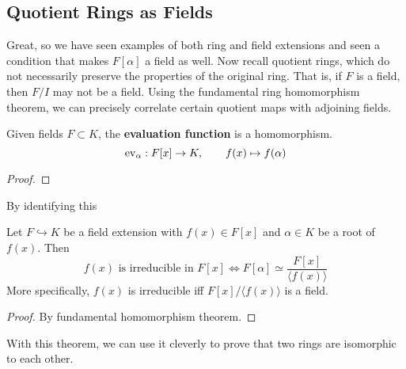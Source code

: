 \subsection{Quotient Rings as Fields} 

  Great, so we have seen examples of both ring and field extensions and seen a condition that makes $F[\alpha]$ a field as well. Now recall quotient rings, which do not necessarily preserve the properties of the original ring. That is, if $F$ is a field, then $F/I$ may not be a field. Using the fundamental ring homomorphism theorem, we can precisely correlate certain quotient maps with adjoining fields. 

  \begin{theorem}
    Given fields $F \subset K$, the \textbf{evaluation function} is a homomorphism. 
    \begin{equation}
      \operatorname{ev}_\alpha: F[x] \rightarrow K, \qquad f(x) \mapsto f(\alpha)
    \end{equation}
  \end{theorem}
  \begin{proof}
    
  \end{proof} 

  By identifying this 

  \begin{theorem}
    Let $F \hookrightarrow K$ be a field extension with $f(x) \in F[x]$ and $\alpha \in K$ be a root of $f(x)$. Then 
    \begin{equation}
      f(x) \text{ is irreducible in } F[x] \iff F[\alpha] \simeq \frac{F[x]}{\langle f(x) \rangle}
    \end{equation}
    More specifically, $f(x)$ is irreducible iff $F[x]/\langle f(x) \rangle$ is a field. 
  \end{theorem}
  \begin{proof}
    By fundamental homomorphism theorem. 
  \end{proof}

  With this theorem, we can use it cleverly to prove that two rings are isomorphic to each other. 

